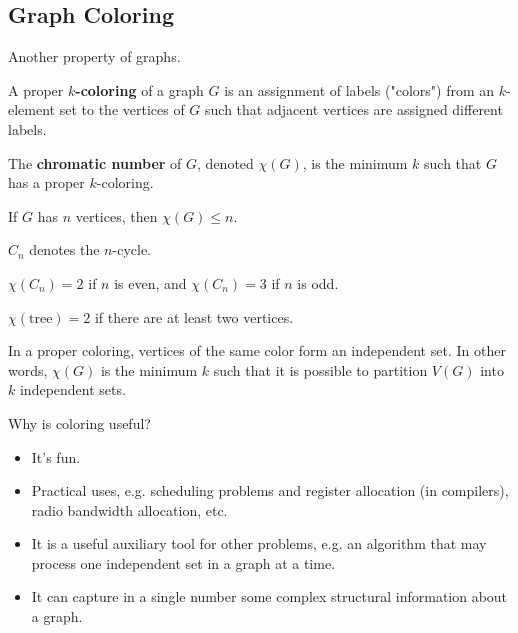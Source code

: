 \documentclass[a4paper]{article}
\begin{document}

\subsection{Graph Coloring}

Another property of graphs.

\begin{definition}
	A proper \( k \)\textbf{-coloring} of a graph \( G \) is an assignment of labels ("colors") from an \( k \)-element set to the vertices of \( G \) such that adjacent vertices are assigned different labels.
\end{definition}

\begin{definition}
	The \textbf{chromatic number} of \( G \), denoted \( \chi(G) \), is the minimum \( k \) such that \( G \) has a proper \( k \)-coloring.
\end{definition}

\begin{note}
	If \( G \) has \( n \) vertices, then \( \chi(G) \le n \).
\end{note}

\begin{notation}
	\( C_n \) denotes the \( n \)-cycle.
\end{notation}

\begin{eg}
	\( \chi(C_n) = 2\) if \( n \) is even, and \( \chi(C_n) = 3 \) if \( n \) is odd.
\end{eg}

\begin{eg}
	\( \chi(\text{tree}) = 2 \) if there are at least two vertices.
\end{eg}

\begin{note}
	In a proper coloring, vertices of the same color form an independent set. In other words, \( \chi(G) \) is the minimum \( k \) such that it is possible to partition \( V(G) \) into \( k \) independent sets.
\end{note}

Why is coloring useful?
\begin{itemize}
	\item It's fun. 
	\item Practical uses, e.g. scheduling problems and register allocation (in compilers), radio bandwidth allocation, etc.
	\item It is a useful auxiliary tool for other problems, e.g. an algorithm that may process one independent set in a graph at a time.
	\item It can capture in a single number some complex structural information about a graph.
\end{itemize}
\end{document}
